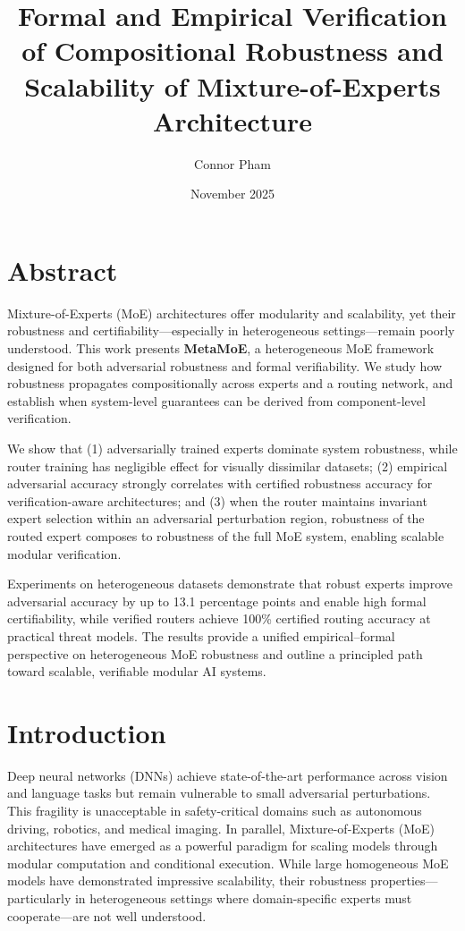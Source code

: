 \documentclass[11pt,a4paper]{article}
\title{Formal and Empirical Verification of Compositional Robustness and Scalability of Mixture-of-Experts Architecture}
\author{Connor Pham}
\date{November 2025}
\begin{document}
\maketitle

\section{Abstract}

Mixture-of-Experts (MoE) architectures offer modularity and scalability, yet their robustness and certifiability---especially in heterogeneous settings---remain poorly understood. This work presents \textbf{MetaMoE}, a heterogeneous MoE framework designed for both adversarial robustness and formal verifiability. We study how robustness propagates compositionally across experts and a routing network, and establish when system-level guarantees can be derived from component-level verification.

We show that (1) adversarially trained experts dominate system robustness, while router training has negligible effect for visually dissimilar datasets; (2) empirical adversarial accuracy strongly correlates with certified robustness accuracy for verification-aware architectures; and (3) when the router maintains invariant expert selection within an adversarial perturbation region, robustness of the routed expert composes to robustness of the full MoE system, enabling scalable modular verification.

Experiments on heterogeneous datasets demonstrate that robust experts improve adversarial accuracy by up to 13.1 percentage points and enable high formal certifiability, while verified routers achieve 100\% certified routing accuracy at practical threat models. The results provide a unified empirical--formal perspective on heterogeneous MoE robustness and outline a principled path toward scalable, verifiable modular AI systems.

\section{Introduction}

Deep neural networks (DNNs) achieve state-of-the-art performance across vision and language tasks but remain vulnerable to small adversarial perturbations. This fragility is unacceptable in safety-critical domains such as autonomous driving, robotics, and medical imaging. In parallel, Mixture-of-Experts (MoE) architectures have emerged as a powerful paradigm for scaling models through modular computation and conditional execution. While large homogeneous MoE models have demonstrated impressive scalability, their robustness properties---particularly in heterogeneous settings where domain-specific experts must cooperate---are not well understood.
\end{document}
